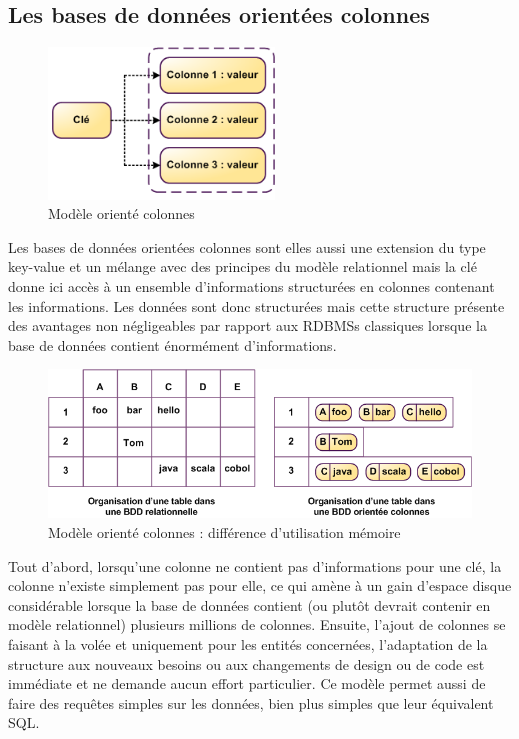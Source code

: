 \documentclass[11pt]{article}
\begin{document}
\subsection{Les bases de données orientées colonnes}
\begin{figure}[H]
  \centering
  \begin{center}
    \includegraphics[width=6cm]{columns.png}
  \end{center}
  \caption{Modèle orienté colonnes\cite{tourhorizon}}
\end{figure}
Les bases de données orientées colonnes sont elles aussi une extension du type key-value et un mélange avec des principes du modèle relationnel mais la clé donne ici accès à un ensemble d'informations structurées en colonnes contenant les informations. Les données sont donc structurées mais cette structure présente des avantages non négligeables par rapport aux RDBMSs classiques lorsque la base de données contient énormément d'informations.
\begin{figure}[H]
  \centering
  \begin{center}
    \includegraphics[width=12cm]{nosql-colonnes.png}
  \end{center}
  \caption{Modèle orienté colonnes : différence d'utilisation mémoire\cite{tourhorizon}}
\end{figure}

Tout d'abord, lorsqu'une colonne ne contient pas d'informations pour une clé, la colonne n'existe simplement pas pour elle, ce qui amène à un gain d'espace disque considérable lorsque la base de données contient (ou plutôt devrait contenir en modèle relationnel) plusieurs millions de colonnes. Ensuite, l'ajout de colonnes se faisant à la volée et uniquement pour les entités concernées, l'adaptation de la structure aux nouveaux besoins ou aux changements de design ou de code est immédiate et ne demande aucun effort particulier. Ce modèle permet aussi de faire des requêtes simples sur les données, bien plus simples que leur équivalent SQL.
\end{document}
